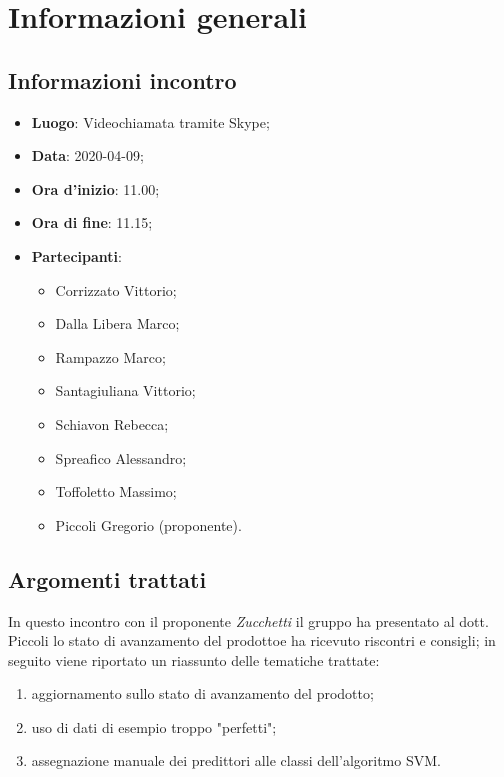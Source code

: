 \section{Informazioni generali}
    \subsection{Informazioni incontro}
        \begin{itemize}
            \item \textbf{Luogo}: Videochiamata tramite Skype;
            \item \textbf{Data}: 2020-04-09;
            \item \textbf{Ora d'inizio}: 11.00;
            \item \textbf{Ora di fine}: 11.15;
            \item \textbf{Partecipanti}: 
            \begin{itemize}
            	\item Corrizzato Vittorio;
                \item Dalla Libera Marco;
                \item Rampazzo Marco;
                \item Santagiuliana Vittorio;
                \item Schiavon Rebecca;
                \item Spreafico Alessandro;
                \item Toffoletto Massimo;
                \item Piccoli Gregorio (proponente).
            \end{itemize}
        \end{itemize}
    \subsection{Argomenti trattati}
        In questo incontro con il proponente \textit{Zucchetti} il gruppo ha presentato al dott. Piccoli lo stato di avanzamento del prodotto\glosp e ha ricevuto riscontri e consigli; in seguito viene riportato un riassunto delle tematiche trattate:
        \begin{enumerate}
            \item aggiornamento sullo stato di avanzamento del prodotto\glo;
            \item uso di dati di esempio troppo "perfetti";
            \item assegnazione manuale dei predittori alle classi dell'algoritmo SVM\glo.
        \end{enumerate}
